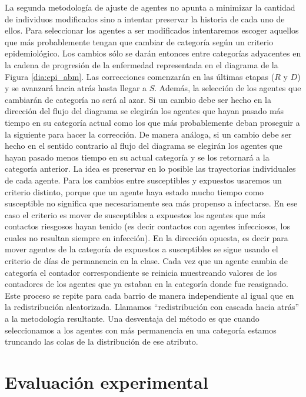 La segunda metodología de ajuste de agentes no apunta a minimizar la cantidad de individuos modificados sino a intentar preservar la historia de cada uno de ellos. Para seleccionar los agentes a ser modificados intentaremos escoger aquellos que más probablemente tengan que cambiar de categoría según un criterio epidemiológico. Los cambios sólo se darán entonces entre categorías adyacentes en la cadena de progresión de la enfermedad representada en el diagrama de la Figura \ref{dia:epi_abm}. Las correcciones comenzarán en las últimas etapas ($R$ y $D$) y se avanzará hacia atrás hasta llegar a $S$. Además, la selección de los agentes que cambiarán de categoría no será al azar. Si un cambio debe ser hecho en la dirección del flujo del diagrama se elegirán los agentes que hayan pasado más tiempo en su categoría actual como los que más probablemente deban proseguir a la siguiente para hacer la corrección. De manera análoga, si un cambio debe ser hecho en el sentido contrario al flujo del diagrama se elegirán los agentes que hayan pasado menos tiempo en su actual categoría y se los retornará a la categoría anterior. La idea es preservar en lo posible las trayectorias individuales de cada agente. Para los cambios entre susceptibles y expuestos usaremos un criterio distinto, porque que un agente haya estado mucho tiempo como susceptible no significa que necesariamente sea más propenso a infectarse. En ese caso el criterio es mover de susceptibles a expuestos los agentes que más contactos riesgosos hayan tenido (es decir contactos con agentes infecciosos, los cuales no resultan siempre en infección). En la dirección opuesta, es decir para mover agentes de la categoría de expuestos a susceptibles se sigue usando el criterio de días de permanencia en la clase. Cada vez que un agente cambia de categoría el contador correspondiente se reinicia muestreando valores de los contadores de los agentes que ya estaban en la categoría donde fue reasignado. Este proceso se repite para cada barrio de manera independiente al igual que en la redistribución aleatorizada. Llamamos ``redistribución con cascada hacia atrás'' a la metodología resultante. Una desventaja del método es que cuando seleccionamos a los agentes con más permanencia en una categoría estamos truncando las colas de la distribución de ese atributo.

\section{Evaluación experimental}


